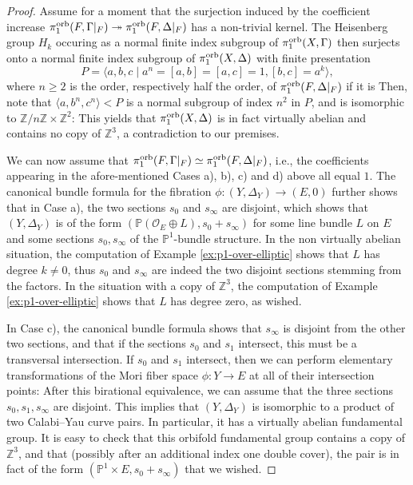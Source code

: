 \documentclass{amsart}
\newcommand{\pp}{\mathbb{P}}
\newcommand{\zz}{\mathbb{Z}}
\theoremstyle{definition}
\theoremstyle{remark}
\numberwithin{equation}{section}
\begin{document}
\begin{proof}
Assume for a moment that the surjection induced by the coefficient increase
$\pi_1^{\rm orb}(F,\Gamma|_F)\twoheadrightarrow \pi_1^{\rm orb}(F,\Delta|_F)$
has a non-trivial kernel. The Heisenberg group $H_k$ occuring as a  normal finite index subgroup of
$\pi_1^{\rm orb}(X,\Gamma)$ then surjects onto a normal finite index subgroup of $\pi_1^{\rm orb}(X,\Delta)$ with finite presentation
$$P = \langle a,b,c\mid a^n = [a,b]=[a,c]=1,[b,c]=a^k\rangle,$$
where $n\ge 2$ is the order, respectively half the order, of $\pi_1^{\rm orb}(F,\Delta|_F)$ if it is Then, note that $\langle a, b^n, c^n\rangle  < P$ is a normal subgroup of index $n^2$ in $P$, and is isomorphic to $\zz/n\zz\times \zz^2$: This yields that $\pi_1^{\rm orb}(X,\Delta)$ is in fact virtually abelian and contains no copy of $\zz^3$, a contradiction to our premises.

We can now assume that $\pi_1^{\rm orb}(F,\Gamma|_F)\simeq \pi_1^{\rm orb}(F,\Delta|_F)$, i.e., the coefficients appearing in the afore-mentioned Cases a), b), c) and d) above all equal $1$. The canonical bundle formula for the fibration $\phi:(Y,\Delta_Y)\to (E,0)$ further shows that in Case a), the two sections $s_0$ and $s_{\infty}$ are disjoint, which shows that $(Y,\Delta_Y)$ is of the form $(\mathbb{P}(\mathcal{O}_E\oplus L),s_0+s_{\infty})$ for some line bundle $L$ on $E$ and some sections $s_0, s_{\infty}$ of the $\pp^1$-bundle structure. In the non virtually abelian situation, the computation of Example \ref{ex:p1-over-elliptic} shows that $L$ has degree $k\neq 0$, thus $s_0$ and $s_{\infty}$ are indeed the two disjoint sections stemming from the factors. In the situation with a copy of $\zz^3$, the computation of Example \ref{ex:p1-over-elliptic} shows that $L$ has degree zero, as wished.

In Case c), the canonical bundle formula shows that $s_{\infty}$ is disjoint from the other two sections, and that if the sections $s_0$ and $s_1$ intersect, this must be a transversal intersection. If $s_0$ and $s_1$ intersect, then we can perform elementary transformations of the Mori fiber space $\phi: Y\to E$ at all of their intersection points: After this birational equivalence, we can assume that the three sections $s_0, s_1,s_{\infty}$ are disjoint. This implies that $(Y,\Delta_Y)$ is isomorphic to a product of two Calabi--Yau curve pairs. In particular, it has a virtually abelian fundamental group. It is easy to check that this orbifold fundamental group contains a copy of $\zz^3$, and that (possibly after an additional index one double cover), the pair is in fact of the form $(\pp^1\times E, s_0+s_{\infty})$ that we wished.


\end{proof}
\end{document}
